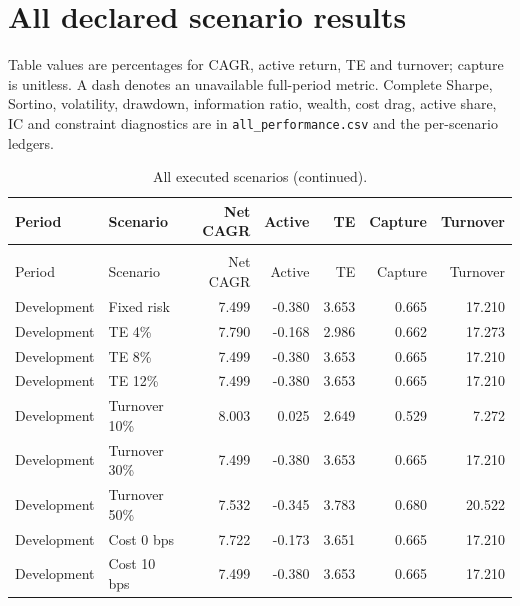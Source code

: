 \documentclass[11pt,a4paper]{article}
\renewcommand{\arraystretch}{1.12}
\begin{document}
\section{All declared scenario results}
Table values are percentages for CAGR, active return, TE and turnover;
capture is unitless. A dash denotes an unavailable full-period metric.
Complete Sharpe, Sortino, volatility, drawdown, information ratio, wealth,
cost drag, active share, IC and constraint diagnostics are in
\texttt{all\_performance.csv} and the per-scenario ledgers.
\begin{center}\footnotesize
\setlength{\tabcolsep}{4pt}
\renewcommand{\arraystretch}{1.06}
\begin{longtable}{@{}llrrrrr@{}}
\caption{All executed scenarios; failures are retained.}\label{allresults}\\
\toprule Period & Scenario & Net CAGR & Active & TE & Capture & Turnover\\\midrule\endfirsthead
\caption[]{All executed scenarios (continued).}\\
\toprule Period & Scenario & Net CAGR & Active & TE & Capture & Turnover\\\midrule\endhead

Development & Fixed risk & 7.499 & -0.380 & 3.653 & 0.665 & 17.210\\

Development & TE 4\% & 7.790 & -0.168 & 2.986 & 0.662 & 17.273\\

Development & TE 8\% & 7.499 & -0.380 & 3.653 & 0.665 & 17.210\\

Development & TE 12\% & 7.499 & -0.380 & 3.653 & 0.665 & 17.210\\

Development & Turnover 10\% & 8.003 & 0.025 & 2.649 & 0.529 & 7.272\\

Development & Turnover 30\% & 7.499 & -0.380 & 3.653 & 0.665 & 17.210\\

Development & Turnover 50\% & 7.532 & -0.345 & 3.783 & 0.680 & 20.522\\

Development & Cost 0 bps & 7.722 & -0.173 & 3.651 & 0.665 & 17.210\\

Development & Cost 10 bps & 7.499 & -0.380 & 3.653 & 0.665 & 17.210\\


\end{longtable}
\end{center}
\end{document}
